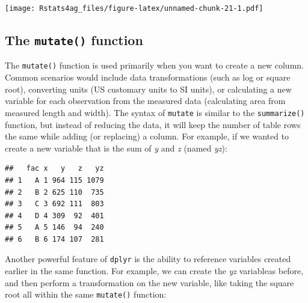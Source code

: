 \documentclass[letterpaper,]{book}
\newenvironment{Shaded}{\begin{snugshade}}{\end{snugshade}}
\newcommand{\DataTypeTok}[1]{\textcolor[rgb]{0.13,0.29,0.53}{#1}}
\newcommand{\KeywordTok}[1]{\textcolor[rgb]{0.13,0.29,0.53}{\textbf{#1}}}
\newcommand{\NormalTok}[1]{#1}
\newcommand{\OperatorTok}[1]{\textcolor[rgb]{0.81,0.36,0.00}{\textbf{#1}}}
\newcommand{\StringTok}[1]{\textcolor[rgb]{0.31,0.60,0.02}{#1}}
\begin{document}
\texttt{[image: Rstats4ag\_files/figure-latex/unnamed-chunk-21-1.pdf]}

\hypertarget{the-mutate-function}{%
\subsection{\texorpdfstring{The \texttt{mutate()} function}{The mutate() function}}\label{the-mutate-function}}

The \texttt{mutate()} function is used primarily when you want to create a new column. Common scenarios would include data transformations (such as log or square root), converting units (US customary units to SI units), or calculating a new variable for each observation from the measured data (calculating area from measured length and width). The syntax of \texttt{mutate} is similar to the \texttt{summarize()} function, but instead of reducing the data, it will keep the number of table rows the same while adding (or replacing) a column. For example, if we wanted to create a new variable that is the sum of \emph{y} and \emph{z} (named \emph{yz}):

\begin{Shaded}
\end{Shaded}

\begin{verbatim}
##   fac x   y   z   yz
## 1   A 1 964 115 1079
## 2   B 2 625 110  735
## 3   C 3 692 111  803
## 4   D 4 309  92  401
## 5   A 5 146  94  240
## 6   B 6 174 107  281
\end{verbatim}

Another powerful feature of \texttt{dplyr} is the ability to reference variables created earlier in the same function. For example, we can create the \emph{yz} variableas before, and then perform a transformation on the new variable, like taking the square root all within the same \texttt{mutate()} function:

\begin{Shaded}
\end{Shaded}
\end{document}
